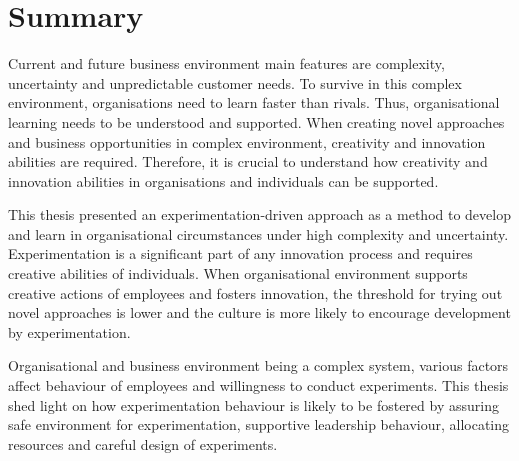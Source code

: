 \chapter{Summary}
Current and future business environment main features are complexity, uncertainty and unpredictable customer needs. To survive in this complex environment, organisations need to learn faster than rivals. Thus, organisational learning needs to be understood and supported. When creating novel approaches and business opportunities in complex environment, creativity and innovation abilities are required. Therefore, it is crucial to understand how creativity and innovation abilities in organisations and individuals can be supported. 

This thesis presented an experimentation-driven approach as a method to develop and learn in organisational circumstances under high complexity and uncertainty. Experimentation is a significant part of any innovation process and requires creative abilities of individuals. When organisational environment supports creative actions of employees and fosters innovation, the threshold for trying out novel approaches is lower and the culture is more likely to encourage development by experimentation. 

Organisational and business environment being a complex system, various factors affect behaviour of employees and willingness to conduct experiments. This thesis shed light on how experimentation behaviour is likely to be fostered by assuring safe environment for experimentation, supportive leadership behaviour, allocating resources and careful design of experiments. 


